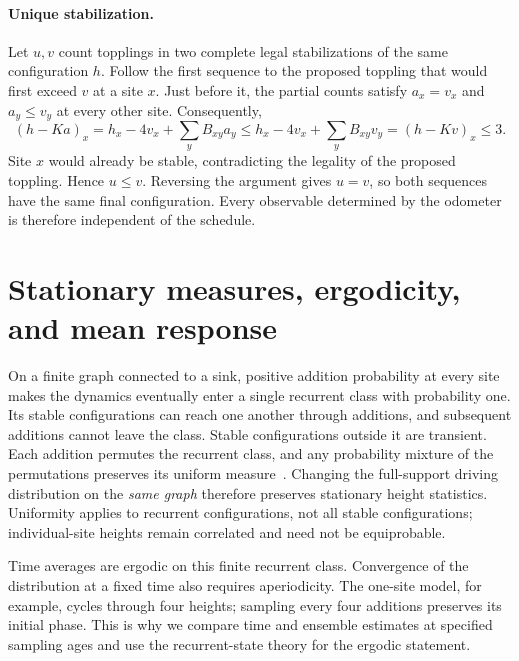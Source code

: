 \paragraph{Unique stabilization.}
Let $u,v$ count topplings in two complete legal stabilizations of the same configuration $h$. Follow the first sequence to the proposed toppling that would first exceed $v$ at a site $x$. Just before it, the partial counts satisfy $a_x=v_x$ and $a_y\leq v_y$ at every other site. Consequently,
\begin{equation}
 (h-Ka)_x=h_x-4v_x+\sum_y B_{xy}a_y
 \leq h_x-4v_x+\sum_y B_{xy}v_y=(h-Kv)_x\leq3.
\end{equation}
Site $x$ would already be stable, contradicting the legality of the proposed toppling. Hence $u\leq v$. Reversing the argument gives $u=v$, so both sequences have the same final configuration. Every observable determined by the odometer is therefore independent of the schedule.

\section{Stationary measures, ergodicity, and mean response}\label{sec:recurrence}
On a finite graph connected to a sink, positive addition probability at every site makes the dynamics eventually enter a single recurrent class with probability one. Its stable configurations can reach one another through additions, and subsequent additions cannot leave the class. Stable configurations outside it are transient. Each addition permutes the recurrent class, and any probability mixture of the permutations preserves its uniform measure~\cite[Theorems 2.9, 2.11; Exercise 2.16]{jarai2018}. Changing the full-support driving distribution on the \emph{same graph} therefore preserves stationary height statistics. Uniformity applies to recurrent configurations, not all stable configurations; individual-site heights remain correlated and need not be equiprobable.

Time averages are ergodic on this finite recurrent class. Convergence of the distribution at a fixed time also requires aperiodicity. The one-site model, for example, cycles through four heights; sampling every four additions preserves its initial phase. This is why we compare time and ensemble estimates at specified sampling ages and use the recurrent-state theory for the ergodic statement.

